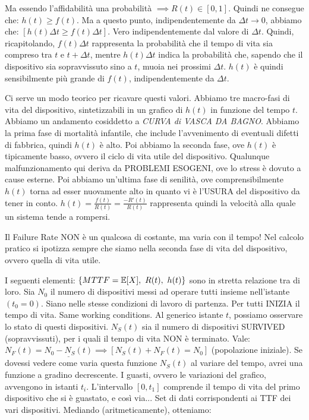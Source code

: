 Ma essendo l'affidabilità una probabilità $\implies R(t) \in [0,1]$. Quindi ne consegue che: $h(t)\geq f(t)$. Ma a questo punto, indipendentemente da $\Delta t\to 0$, abbiamo che: $[h(t)\Delta t\geq f(t)\Delta t]$. Vero indipendentemente dal valore di $\Delta t$. Quindi, ricapitolando, $f(t)\Delta t$ rappresenta la probabilità che il tempo di vita sia compreso tra $t$ e $t+\Delta t$, mentre $h(t)\Delta t$ indica la probabilità che, sapendo che il dispositivo sia sopravvissuto sino a $t$, muoia nei prossimi $\Delta t$. $h(t)$ è quindi sensibilmente più grande di $f(t)$, indipendentemente da $\Delta t$. 

Ci serve un modo teorico per ricavare questi valori. Abbiamo tre macro-fasi di vita del dispositivo, sintetizzabili in un grafico di $h(t)$ in funzione del tempo $t$. Abbiamo un andamento cosiddetto a \textit{CURVA di VASCA DA BAGNO}. Abbiamo la prima fase di mortalità infantile, che include l'avvenimento di eventuali difetti di fabbrica, quindi $h(t)$ è alto. Poi abbiamo la seconda fase, ove $h(t)$ è tipicamente basso, ovvero il ciclo di vita utile del dispositivo. Qualunque malfunzionamento qui deriva da PROBLEMI ESOGENI, ove lo stress è dovuto a cause esterne. Poi abbiamo un'ultima fase di senilità, ove comprensibilmente $h(t)$ torna ad esser nuovamente alto in quanto vi è l'USURA del dispositivo da tener in conto. $h(t)=\frac{f(t)}{R(t)}=\frac{-R'(t)}{R(t)}$ rappresenta quindi la velocità alla quale un sistema tende a rompersi.

Il Failure Rate NON è un qualcosa di costante, ma varia con il tempo! Nel calcolo pratico si ipotizza sempre che siamo nella seconda fase di vita del dispositivo, ovvero quella di vita utile.

I seguenti elementi: $\{MTTF=\E[X],\ R(t),\ h(t)\}$ sono in stretta relazione tra di loro. Sia $N_0$ il numero di dispositivi messi ad operare tutti insieme nell'istante $(t_0=0)$. Siano nelle stesse condizioni di lavoro di partenza. Per tutti INIZIA il tempo di vita. Same working conditions. Al generico istante $t$, possiamo osservare lo stato di questi dispositivi. $N_S(t)$ sia il numero di dispositivi SURVIVED (sopravvissuti), per i quali il tempo di vita NON è terminato. Vale: $N_F(t) = \underline{N_0-N_S(t)} \implies [N_S(t) + N_F(t) = N_0]$ (popolazione iniziale). Se dovessi vedere come varia questa funzione $N_S(t)$ al variare del tempo, avrei una funzione a gradino decrescente. I guasti, ovvero le variazioni del grafico, avvengono in istanti $t_i$. L'intervallo $[0,t_1]$ comprende il tempo di vita del primo dispositivo che si è guastato, e così via... Set di dati corrispondenti ai TTF dei vari dispositivi. Mediando (aritmeticamente), otteniamo: 


